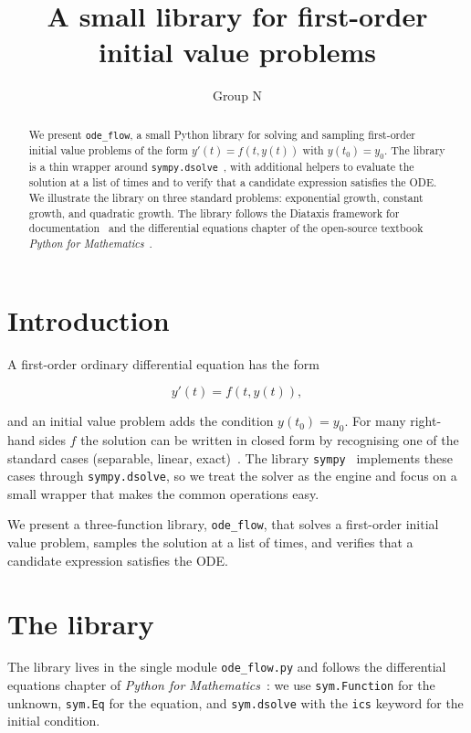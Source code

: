 \documentclass[11pt]{article}
\title{A small library for first-order initial value problems}
\author{Group N}
\date{}
\begin{document}
\maketitle

\begin{abstract}
We present \texttt{ode\_flow}, a small Python library for solving and
sampling first-order initial value problems of the form
\(y'(t) = f(t, y(t))\) with \(y(t_0) = y_0\). The library is a thin
wrapper around \texttt{sympy.dsolve}~\cite{meurer2017}, with
additional helpers to evaluate the solution at a list of times and to
verify that a candidate expression satisfies the ODE. We illustrate
the library on three standard problems: exponential growth, constant
growth, and quadratic growth. The library follows the Diataxis
framework for documentation~\cite{procida2017} and the differential
equations chapter of the open-source textbook \emph{Python for
Mathematics}~\cite{knight2024}.
\end{abstract}

\section{Introduction}

A first-order ordinary differential equation has the form

\[
    y'(t) = f(t, y(t)),
\]

and an initial value problem adds the condition \(y(t_0) = y_0\). For
many right-hand sides \(f\) the solution can be written in closed
form by recognising one of the standard cases (separable, linear,
exact)~\cite{boyce2017}. The library \texttt{sympy}~\cite{meurer2017}
implements these cases through \texttt{sympy.dsolve}, so we treat the
solver as the engine and focus on a small wrapper that makes the
common operations easy.

We present a three-function library,
\texttt{ode\_flow}, that solves a first-order initial value problem,
samples the solution at a list of times, and verifies that a
candidate expression satisfies the ODE.

\section{The library}

The library lives in the single module \texttt{ode\_flow.py} and
follows the differential equations chapter of \emph{Python for
Mathematics}~\cite{knight2024}: we use \texttt{sym.Function} for the
unknown, \texttt{sym.Eq} for the equation, and \texttt{sym.dsolve}
with the \texttt{ics} keyword for the initial condition.
\end{document}
